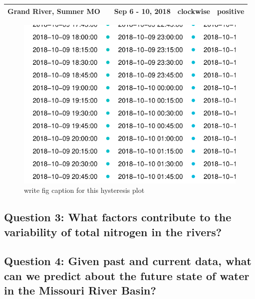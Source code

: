 \documentclass[12pt,]{article}
\begin{document}
\begin{longtable}[]{@{}lclll@{}}
\begin{minipage}[t]{0.15\columnwidth}
Grand River, Sumner MO\strut
\end{minipage} & \begin{minipage}[t]{0.22\columnwidth}\centering
06902000\strut
\end{minipage} & \begin{minipage}[t]{0.20\columnwidth}\raggedright
Sep 6 - 10, 2018\strut
\end{minipage} & \begin{minipage}[t]{0.17\columnwidth}\raggedright
clockwise\strut
\end{minipage} & \begin{minipage}[t]{0.12\columnwidth}\raggedright
positive\strut
\end{minipage}\tabularnewline
\bottomrule
\end{longtable}

\begin{figure}
\centering
\includegraphics{Missouri-Reasearch-Project---FINAL_files/figure-latex/randolphstorm-1.pdf}
\caption{write fig caption for this hysteresis plot}
\end{figure}

\hypertarget{question-3-what-factors-contribute-to-the-variability-of-total-nitrogen-in-the-rivers}{%
\subsection{Question 3: What factors contribute to the variability of
total nitrogen in the
rivers?}\label{question-3-what-factors-contribute-to-the-variability-of-total-nitrogen-in-the-rivers}}

\hypertarget{question-4-given-past-and-current-data-what-can-we-predict-about-the-future-state-of-water-in-the-missouri-river-basin}{%
\subsection{Question 4: Given past and current data, what can we predict
about the future state of water in the Missouri River
Basin?}\label{question-4-given-past-and-current-data-what-can-we-predict-about-the-future-state-of-water-in-the-missouri-river-basin}}
\end{document}
